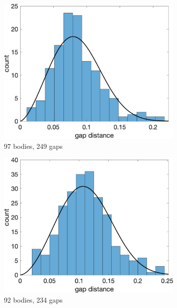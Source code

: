 \documentclass[preprint,10pt]{elsarticle}
\begin{document}
\begin{figure}[H]
\begin{subfigure}[b]{0.3\textwidth}
\includegraphics*[width =\linewidth]{./figs/hist100b_112}
\caption{97 bodies, 249 gaps}
\end{subfigure}
\begin{subfigure}[b]{0.3\textwidth}
\includegraphics*[width =\linewidth]{./figs/hist100b_164}
\caption{92 bodies, 234 gaps}
\end{subfigure}%
\begin{subfigure}[b]{0.3\textwidth}

\end{subfigure}
\end{figure}
\end{document}
